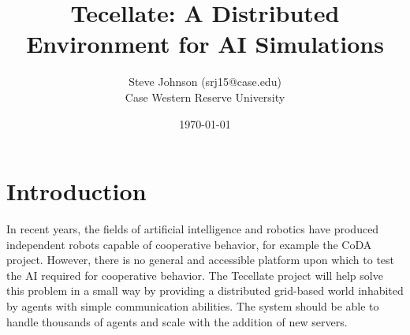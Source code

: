 \documentclass[12pt]{article}
\title{Tecellate: A Distributed Environment for AI Simulations}
\author{
        Steve Johnson (srj15@case.edu)\\
        Case Western Reserve University\\
}
\date{\today}
\begin{document}
\doublespacing
\maketitle


\section{Introduction}

In recent years, the fields of artificial intelligence and robotics have produced independent robots capable of cooperative behavior, for example the CoDA project\cite{CoDA}. However, there is no general and accessible platform upon which to test the AI required for cooperative behavior. The Tecellate project will help solve this problem in a small way by providing a distributed grid-based world inhabited by agents with simple communication abilities. The system should be able to handle thousands of agents and scale with the addition of new servers.











\end{document}
